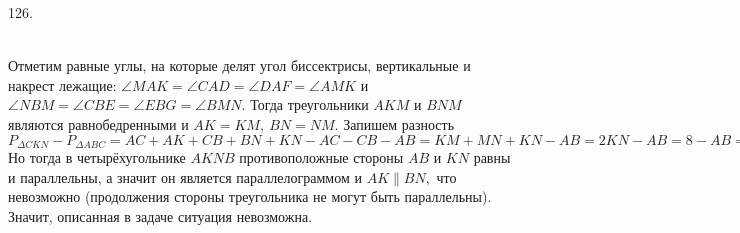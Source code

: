 126. \begin{figure}[ht!]
\end{figure}\\
Отметим равные углы, на которые делят угол биссектрисы, вертикальные и накрест лежащие: $\angle MAK=\angle CAD=\angle DAF=\angle AMK$ и $\angle NBM=\angle CBE=\angle EBG=\angle BMN.$ Тогда треугольники $AKM$ и $BNM$ являются равнобедренными и $AK=KM,\ BN=NM.$ Запишем разность $P_{\Delta CKN}-P_{\Delta ABC}=AC+AK+CB+BN+KN-AC-CB-AB=KM+MN+KN-AB=2KN-AB=8-AB=22-18,\ AB=4.$ Но тогда в четырёхугольнике $AKNB$ противоположные стороны $AB$ и $KN$ равны и параллельны, а значит он является параллелограммом и $AK\parallel BN,$ что невозможно (продолжения стороны треугольника не могут быть параллельны). Значит, описанная в задаче ситуация невозможна.\newpage\noindent
